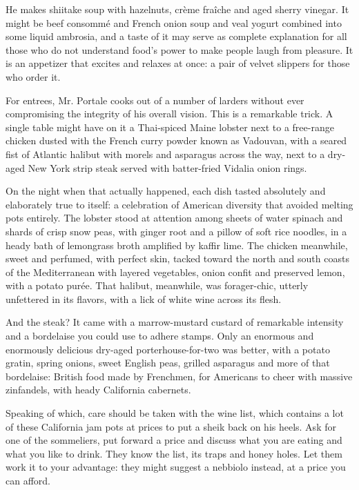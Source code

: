 He makes shiitake soup with hazelnuts, crème fraîche and aged sherry
vinegar. It might be beef consommé and French onion soup and veal yogurt
combined into some liquid ambrosia, and a taste of it may serve as
complete explanation for all those who do not understand food's power to
make people laugh from pleasure. It is an appetizer that excites and
relaxes at once: a pair of velvet slippers for those who order it.

For entrees, Mr. Portale cooks out of a number of larders without ever
compromising the integrity of his overall vision. This is a remarkable
trick. A single table might have on it a Thai-spiced Maine lobster next
to a free-range chicken dusted with the French curry powder known as
Vadouvan, with a seared fist of Atlantic halibut with morels and
asparagus across the way, next to a dry-aged New York strip steak served
with batter-fried Vidalia onion rings.

On the night when that actually happened, each dish tasted absolutely
and elaborately true to itself: a celebration of American diversity that
avoided melting pots entirely. The lobster stood at attention among
sheets of water spinach and shards of crisp snow peas, with ginger root
and a pillow of soft rice noodles, in a heady bath of lemongrass broth
amplified by kaffir lime. The chicken meanwhile, sweet and perfumed,
with perfect skin, tacked toward the north and south coasts of the
Mediterranean with layered vegetables, onion confit and preserved lemon,
with a potato purée. That halibut, meanwhile, was forager-chic, utterly
unfettered in its flavors, with a lick of white wine across its flesh.

And the steak? It came with a marrow-mustard custard of remarkable
intensity and a bordelaise you could use to adhere stamps. Only an
enormous and enormously delicious dry-aged porterhouse-for-two was
better, with a potato gratin, spring onions, sweet English peas, grilled
asparagus and more of that bordelaise: British food made by Frenchmen,
for Americans to cheer with massive zinfandels, with heady California
cabernets.

Speaking of which, care should be taken with the wine list, which
contains a lot of these California jam pots at prices to put a sheik
back on his heels. Ask for one of the sommeliers, put forward a price
and discuss what you are eating and what you like to drink. They know
the list, its traps and honey holes. Let them work it to your advantage:
they might suggest a nebbiolo instead, at a price you can afford.

